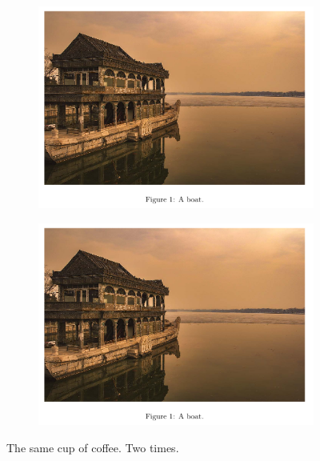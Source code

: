 \documentclass{article}
\begin{document}
\begin{figure}[h]
    \centering
    \begin{subfigure}{0.4\linewidth}
        \includegraphics[width=\linewidth]{boat.png}
    \end{subfigure}
    \begin{subfigure}{0.4\linewidth}
        \includegraphics[width=\linewidth]{boat.png}
    \end{subfigure}
    \caption{The same cup of coffee. Two times.}
    \label{fig:coffee}
\end{figure}
\end{document}
